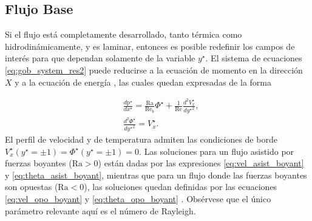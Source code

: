 \subsection{Flujo Base} \label{sec:fbase}

Si el flujo está completamente desarrollado, tanto térmica como hidrodinámicamente, y es laminar, entonces es posible redefinir los campos de interés para que dependan solamente de la variable $y^{\star}$. El sistema de ecuaciones \ref{eq:gob_system_res2} puede reducirse a la ecuación de momento en la dirección $X$ y a la ecuación de energía \cite{chen1996linear}, las cuales quedan expresadas de la forma 

\begin{align}
&\frac{d \text{p}^{\star} }{d x^{\star}} = \frac{\text{Ra}}{\text{Re}_b } \Phi^{\star} + \frac{1}{\text{Re}} \frac{d^2 V^{\star}_x}{d {y^{\star}}^2}, \\
&\frac{d^2 \Phi^{\star}}{ d {y^{\star}}^2 } =  V^{\star}_x \text{.}
\label{eq:base1}
\end{align}
El perfil de velocidad y de temperatura admiten las condiciones de borde \linebreak  $V^{\star}_x({y^{\star}}= \pm 1) = \Phi^{\star} ({y^{\star}}= \pm 1) = 0 $. Las soluciones para un flujo asistido por fuerzas boyantes ($\text{Ra}>0$) están dadas por las expresiones \ref{eq:vel_asist_boyant} y \ref{eq:theta_asist_boyant}, mientras que para un flujo donde las fuerzas boyantes son opuestas ($\text{Ra}<0$), las soluciones quedan definidas por las ecuaciones \ref{eq:vel_opo_boyant} y \ref{eq:theta_opo_boyant} \cite{chen1996linear}. Obsérvese que el único parámetro relevante aquí es el número de Rayleigh.
